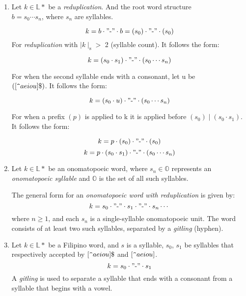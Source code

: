 \begin{enumerate}
      \item
            Let \(k \in \mathbb{L}*\) be a \textit{reduplication}. And the root word structure
            \\ \(b = s_0\cdots s_n\), where \(s_n\) are syllables.

            \[
                  k = b \cdot "\text{-}" \cdot b = (s_0) \cdot "\text{-}" \cdot (s_0)
            \]
            For \textit{reduplication} with $\mid k\mid_{\text{s}}>$ 2 (syllable count). It follows the form:

            \[
                  k = (s_0 \cdot s_1) \cdot "\text{-}" \cdot (s_0 \cdots s_n)
            \]

            For when the second syllable ends with a consonant, let u be\\
            \(([\verb|^|aeiou]\$)\). It follows the form:

            \[
                  k = (s_0 \cdot u) \cdot "\text{-}" \cdot (s_0 \cdots s_n)
            \]

            For when a prefix \((p)\) is applied to k it is applied before \((s_0) \mid (s_0 \cdot s_1)\). It follows the form:

            \[
                  k = p \cdot (s_0) \cdot "\text{-}" \cdot (s_0)
            \]
            \[
                  k = p \cdot (s_0 \cdot s_1) \cdot "\text{-}" \cdot (s_0 \cdots s_n)
            \]
      \item
            Let \( k \in \mathbb{L}* \) be an onomatopoeic word, where \( s_n \in \mathbb{O} \) represents an \textit{onomatopoeic syllable} and \( \mathbb{O} \) is the set of all such syllables.

            The general form for an \textit{onomatopoeic word with reduplication} is given by:
            \[
                  k = s_0 \cdot "\text{-}" \cdot s_1 \cdot "\text{-}" \cdot s_n \cdots
            \]
            where \( n \geq 1 \), and each \( s_n \) is a single-syllable onomatopoeic unit. The word consists of at least two such syllables, separated by a \textit{\textit{gitling}} (hyphen).

      \item
            Let \(k \in \mathbb{L}*\) be a Filipino word, and $s$ is a syllable, $s_0$, $s_1$ be syllables that respectively accepted by \([\verb|^|aeiou]\$\) and \([\verb|^|aeiou]\).
            \[
            k = s_0 \cdot "\text{-}" \cdot s_1
            \]
            A \textit{gitling} is used to separate a syllable that ends with a consonant from a syllable that begins with a vowel.\\


\end{enumerate}
